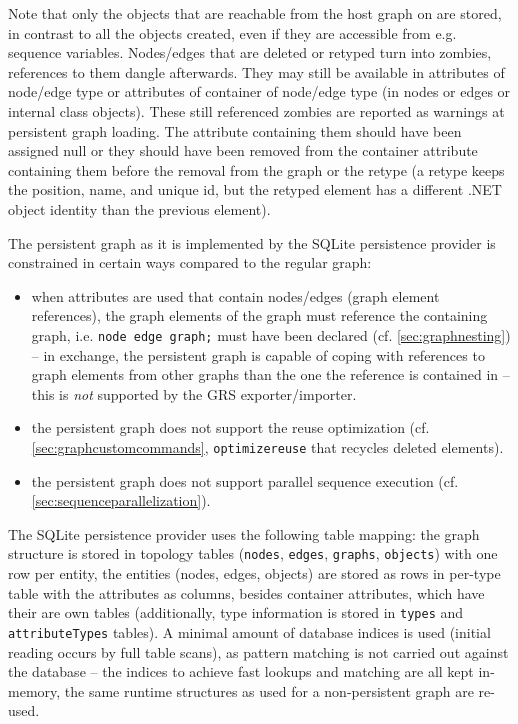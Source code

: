 Note that only the objects that are reachable from the host graph on are stored, in contrast to all the objects created, even if they are accessible from e.g. sequence variables.
Nodes/edges that are deleted or retyped turn into zombies, references to them dangle afterwards.
They may still be available in attributes of node/edge type or attributes of container of node/edge type (in nodes or edges or internal class objects).
These still referenced zombies are reported as warnings at persistent graph loading.
The attribute containing them should have been assigned null or they should have been removed from the container attribute containing them before the removal from the graph or the retype (a retype keeps the position, name, and unique id, but the retyped element has a different .NET object identity than the previous element).

The persistent graph as it is implemented by the SQLite persistence provider is constrained in certain ways compared to the regular graph:
\begin{itemize}
	\item when attributes are used that contain nodes/edges (graph element references), the graph elements of the graph must reference the containing graph, i.e. \texttt{node edge graph;} must have been declared (cf. \ref{sec:graphnesting}) -- in exchange, the persistent graph is capable of coping with references to graph elements from other graphs than the one the reference is contained in -- this is \emph{not} supported by the GRS exporter/importer.
	\item the persistent graph does not support the reuse optimization (cf. \ref{sec:graphcustomcommands}, \texttt{optimizereuse} that recycles deleted elements).
	\item the persistent graph does not support parallel sequence execution (cf. \ref{sec:sequenceparallelization}).
\end{itemize}

The SQLite persistence provider uses the following table mapping: the graph structure is stored in topology tables (\texttt{nodes}, \texttt{edges}, \texttt{graphs}, \texttt{objects}) with one row per entity, the entities (nodes, edges, objects) are stored as rows in per-type table with the attributes as columns, besides container attributes, which have their are own tables (additionally, type information is stored in \texttt{types} and \texttt{attributeTypes} tables).
A minimal amount of database indices is used (initial reading occurs by full table scans), as pattern matching is not carried out against the database -- the indices to achieve fast lookups and matching are all kept in-memory, the same runtime structures as used for a non-persistent graph are re-used.

